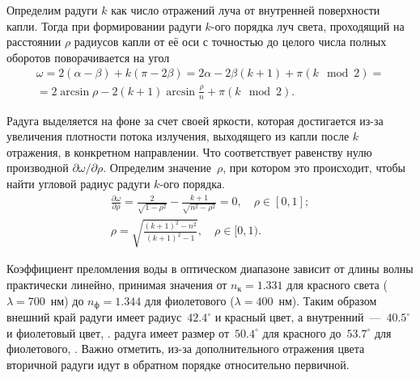 Определим  радуги $k$ как число отражений луча от внутренней поверхности капли. Тогда при формировании радуги $k$-ого порядка луч света, проходящий на расстоянии $\rho$ радиусов капли от её оси с точностью до целого числа полных оборотов поворачивается на угол 
\begin{multline*}
    \omega 
        = 2(\alpha - \beta) + k (\pi - 2\beta) 
        = 2\alpha - 2\beta(k + 1) + \pi (k \!\!\!\! \mod 2) = \\
        = 2\arcsin \rho - 2(k + 1) \arcsin \frac{\rho}{n} + \pi (k \!\!\!\!  \mod 2). 
\end{multline*}

Радуга выделяется на фоне за счет своей яркости, которая достигается из-за увеличения плотности потока излучения, выходящего из капли после $k$ отражения, в конкретном направлении. Что соответствует равенству нулю производной $\partial\omega/\partial\rho$. Определим значение~$\rho$, при котором это происходит, чтобы найти угловой радиус радуги $k$-ого порядка.
\begin{gather*}
    \frac{\partial \omega}{\partial \rho} = \frac{2}{\sqrt{1 - \rho^2}} - \frac{k + 1}{\sqrt{n^2 - \rho^2}} = 0,\quad \rho \in [0,1];\\
    \rho = \sqrt{\frac{(k+1)^2 - n^2}{(k+1)^2 - 1}},\quad \rho \in [0, 1).
\end{gather*}

Коэффициент преломления воды в оптическом диапазоне зависит от длины волны практически линейно, принимая значения от $n_\text{к} = 1.331$ для красного света ($\lambda = 700$~нм) до $n_\text{ф} = 1.344$ для фиолетового ($\lambda = 400$~нм). Таким образом внешний край  радуги имеет радиус~$42.4^\circ$ и красный цвет, а внутренний~---~$40.5^\circ$ и фиолетовый цвет,  .
 радуга имеет размер от~$50.4^\circ$ для красного до~$53.7^\circ$ для фиолетового, . Важно отметить, из-за дополнительного отражения цвета вторичной радуги идут в обратном порядке относительно первичной. 


